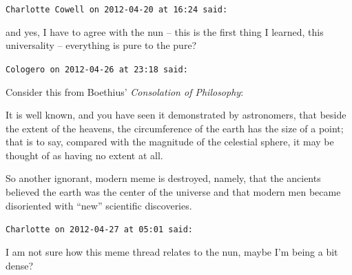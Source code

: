 \begin{footnotesize}
\begin{sffamily}
\hfill

\texttt{Charlotte Cowell on 2012-04-20 at 16:24 said:}

and yes, I have to agree with the nun -- this is the first thing I learned, this universality -- everything is pure to the pure?

\hfill

\texttt{Cologero on 2012-04-26 at 23:18 said:}

Consider this from Boethius' \textit{Consolation of Philosophy}:

\begin{quotex}\footnotesize

It is well known, and you have seen it demonstrated by astronomers, that beside the extent of the heavens, the circumference of the earth has the size of a point; that is to say, compared with the magnitude of the celestial sphere, it may be thought of as having no extent at all.
\end{quotex}


So another ignorant, modern meme is destroyed, namely, that the ancients believed the earth was the center of the universe and that modern men became disoriented with ``new'' scientific discoveries.

\hfill

\texttt{Charlotte on 2012-04-27 at 05:01 said:}

I am not sure how this meme thread relates to the nun, maybe I'm being a bit dense?


\end{sffamily}
\end{footnotesize}
